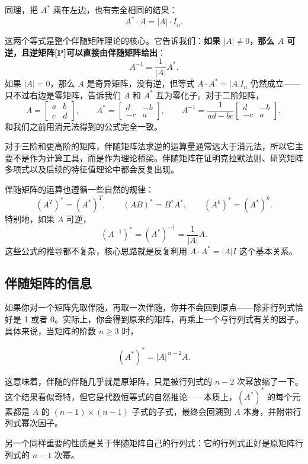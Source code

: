 \documentclass[UTF8]{ctexbook}
\begin{document}
同理，把 $A^*$ 乘在左边，也有完全相同的结果：
\[
A^* \cdot A = |A| \cdot I_n.
\]

这两个等式是整个伴随矩阵理论的核心。它告诉我们：\textbf{如果 $|A|\neq 0$，那么 $A$ 可逆，且逆矩阵[P\label{determinant}\pageref{inverse_matrix}]可以直接由伴随矩阵给出}：
\[
A^{-1} = \frac{1}{|A|} A^*.
\]
如果 $|A|=0$，那么 $A$ 是奇异矩阵，没有逆，但等式 $A\cdot A^*=|A|I_n$ 仍然成立——只不过右边是零矩阵，告诉我们 $A$ 和 $A^*$ 互为零化子。对于二阶矩阵，
\[
A=\begin{bmatrix}a&b\\c&d\end{bmatrix},\qquad
A^*=\begin{bmatrix}d&-b\\-c&a\end{bmatrix},\qquad
A^{-1}=\frac{1}{ad-bc}\begin{bmatrix}d&-b\\-c&a\end{bmatrix},
\]
和我们之前用消元法得到的公式完全一致。

对于三阶和更高阶的矩阵，伴随矩阵法求逆的运算量通常远大于消元法，所以它主要不是作为计算工具，而是作为理论桥梁。伴随矩阵在证明克拉默法则、研究矩阵多项式以及后续的特征值理论中都会反复出现。

伴随矩阵的运算也遵循一些自然的规律：
\[
(A^T)^*=(A^*)^T,\qquad
(AB)^*=B^*A^*,\qquad
(A^k)^*=(A^*)^k.
\]
特别地，如果 $A$ 可逆，
\[
(A^{-1})^*=(A^*)^{-1}=\frac{1}{|A|}A.
\]
这些公式的推导都不复杂，核心思路就是反复利用 $A\cdot A^*=|A|I$ 这个基本关系。
\subsection{伴随矩阵的信息}

如果你对一个矩阵先取伴随，再取一次伴随，你并不会回到原点——除非行列式恰好是 1 或者 0。实际上，你会得到原来的矩阵，再乘上一个与行列式有关的因子。具体来说，当矩阵的阶数 \(n \geq 3\) 时，

\begin{align*}
(A^*)^* = |A|^{\,n-2} A.
\end{align*}

这意味着，伴随的伴随几乎就是原矩阵，只是被行列式的 \(n-2\) 次幂放缩了一下。这个结果看似奇特，但它是代数恒等式的自然推论——本质上，\((A^*)^*\) 的每个元素都是 \(A\) 的 \((n-1) \times (n-1)\) 子式的子式，最终会回溯到 \(A\) 本身，并附带行列式幂次因子。

另一个同样重要的性质是关于伴随矩阵自己的行列式：它的行列式正好是原矩阵行列式的 \(n-1\) 次幂。
\end{document}
